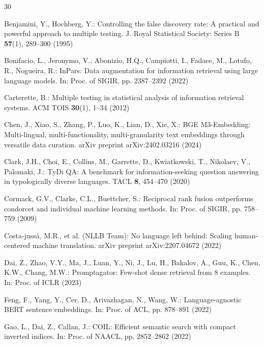 \documentclass[runningheads]{llncs}
\begin{document}
\begin{thebibliography}{30}

Benjamini, Y., Hochberg, Y.: Controlling the false discovery rate: A practical and powerful approach to multiple testing. J. Royal Statistical Society: Series B \textbf{57}(1), 289--300 (1995)

Bonifacio, L., Jeronymo, V., Abonizio, H.Q., Campiotti, I., Fadaee, M., Lotufo, R., Nogueira, R.: InPars: Data augmentation for information retrieval using large language models. In: Proc. of SIGIR, pp. 2387--2392 (2022)

Carterette, B.: Multiple testing in statistical analysis of information retrieval systems. ACM TOIS \textbf{30}(1), 1--34 (2012)

Chen, J., Xiao, S., Zhang, P., Luo, K., Lian, D., Xie, X.: BGE M3-Embedding: Multi-lingual, multi-functionality, multi-granularity text embeddings through versatile data curation. arXiv preprint arXiv:2402.03216 (2024)

Clark, J.H., Choi, E., Collins, M., Garrette, D., Kwiatkowski, T., Nikolaev, V., Palomaki, J.: TyDi QA: A benchmark for information-seeking question answering in typologically diverse languages. TACL \textbf{8}, 454--470 (2020)

Cormack, G.V., Clarke, C.L., Buettcher, S.: Reciprocal rank fusion outperforms condorcet and individual machine learning methods. In: Proc. of SIGIR, pp. 758--759 (2009)

Costa-juss{\`a}, M.R., et al. (NLLB Team): No language left behind: Scaling human-centered machine translation. arXiv preprint arXiv:2207.04672 (2022)

Dai, Z., Zhao, V.Y., Ma, J., Luan, Y., Ni, J., Lu, H., Bakalov, A., Guu, K., Chen, K.W., Chang, M.W.: Promptagator: Few-shot dense retrieval from 8 examples. In: Proc. of ICLR (2023)

Feng, F., Yang, Y., Cer, D., Arivazhagan, N., Wang, W.: Language-agnostic BERT sentence embeddings. In: Proc. of ACL, pp. 878--891 (2022)

Gao, L., Dai, Z., Callan, J.: COIL: Efficient semantic search with compact inverted indices. In: Proc. of NAACL, pp. 2852--2862 (2022)


\end{thebibliography}
\end{document}
